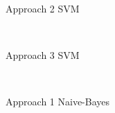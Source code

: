 \begin{figure}[h]
\begin{dBox}
\centering
 \mbox{
  }
  \caption{Approach 2 SVM\label{fig:apr2_svm} }
  
\end{dBox}   
\end{figure}
\begin{figure}[h]
\begin{dBox}
\centering
 \mbox{
  }
  \caption{Approach 3 SVM\label{fig:apr3_svm} } 
\end{dBox}   
\end{figure}

\begin{figure}[h]
\begin{dBox}
\centering
 \mbox{
  }
  \caption{Approach 1 Naive-Bayes\label{fig:apr1_bayes} }   
\end{dBox}   
\end{figure}

